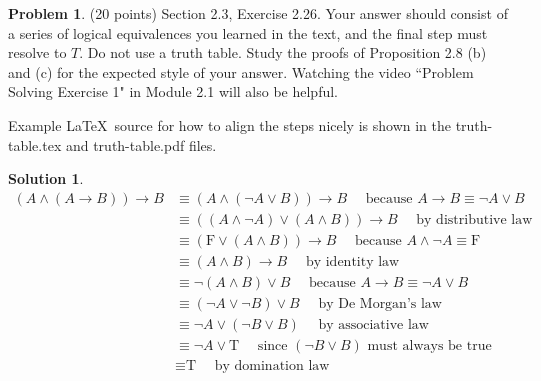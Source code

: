 \documentclass{article}
\theoremstyle{definition}
\newtheorem{problem}{Problem}
\newtheorem*{solution}{Solution}
\begin{document}
\newpage
\begin{problem} (20 points) Section 2.3, Exercise 2.26.
Your answer should consist of a series of logical equivalences 
you learned in the text, and the final step must resolve to $T$.
Do not use a truth table.  Study the proofs of Proposition 2.8 (b) and (c) 
for the expected style of your answer.  Watching the video ``Problem 
Solving Exercise 1" in Module {2.1} will also be helpful.

Example \LaTeX\ source for how to align the steps nicely is shown 
in the truth-table.tex and truth-table.pdf files.
\end{problem}
\begin{solution}
\begin{align*}
(A \land (A \rightarrow B)) \rightarrow B
&\equiv (A \land (\neg A \lor B)) \rightarrow B \quad \mbox{ because } A \rightarrow B \equiv \neg A \lor B\\
&\equiv ((A \land \neg A) \lor (A \land B)) \rightarrow B \quad \mbox{ by distributive law}\\
&\equiv (\text{F} \lor (A \land B)) \rightarrow B \quad \mbox{ because } A \land \neg A \equiv \text{F}\\
&\equiv (A \land B) \rightarrow B \quad \mbox{ by identity law}\\
&\equiv \neg (A \land B) \lor B \quad \mbox{ because } A \rightarrow B \equiv \neg A \lor B\\
&\equiv (\neg A \lor \neg B) \lor B \quad \mbox{ by De Morgan's law}\\
&\equiv \neg A \lor (\neg B \lor B) \quad \mbox{ by associative law}\\
&\equiv \neg A \lor \text{T} \quad \mbox{ since }(\neg B \lor B) \mbox{ must always be true}\\
&\equiv \text{T} \quad \mbox{ by domination law}\\
\end{align*}    
    
\end{solution}
\end{document}
